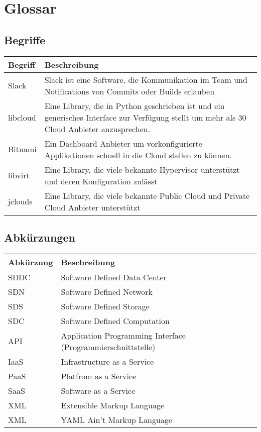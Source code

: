 

\section{Glossar}
\subsection{Begriffe}

\begin{tabularx}{\linewidth}{l | X}
    \textbf{Begriff} & \textbf{Beschreibung}\\
    \hline
     Slack &  Slack ist eine Software, die Kommunikation im Team und Notifications von 
     Commits oder Builds erlauben\\
    \hline
    libcloud & Eine Library, die in Python geschrieben ist und ein generisches 
    Interface zur Verfügung stellt um mehr als 30 Cloud Anbieter anzusprechen.\\
    \hline
    Bitnami & Ein Dashboard Anbieter um vorkonfigurierte Applikationen schnell in die Cloud 
    stellen zu können.\\
    \hline
    libvirt & Eine Library, die viele bekannte Hypervisor unterstützt und deren 
    Konfiguration zulässt\\
    \hline
    jclouds & Eine Library, die viele bekannte Public Cloud und Private Cloud Anbieter unterstützt\\
    \hline
\end{tabularx}

\subsection{Abkürzungen}
\begin{tabularx}{\linewidth}{l | X}
    \textbf{Abkürzung} & \textbf{Beschreibung}\\
    \hline
    SDDC & Software Defined Data Center\\
    \hline
    SDN & Software Defined Network\\
    \hline
    SDS & Software Defined Storage\\
    \hline
    SDC & Software Defined Computation\\
    \hline
    API & Application Programming Interface (Programmierschnittstelle)\\
    \hline
    IaaS & Infrastructure as a Service\\
    \hline
    PaaS & Platfrom as a Service\\
    \hline
    SaaS & Software as a Service\\
    \hline
    XML & Extensible Markup Language\\
    \hline
    XML & YAML Ain’t Markup Language\\
\end{tabularx}
